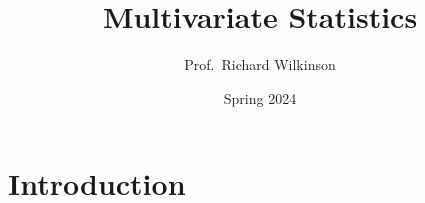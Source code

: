 \documentclass[
]{book}
\title{Multivariate Statistics}
\author{Prof.~Richard Wilkinson}
\date{Spring 2024}
\theoremstyle{definition}
\theoremstyle{definition}
\theoremstyle{definition}
\theoremstyle{definition}
\theoremstyle{remark}
\begin{document}
\maketitle

{
\setcounter{tocdepth}{1}
\tableofcontents
}
\hypertarget{introduction}{%
\chapter*{Introduction}\label{introduction}}

\newcommand{\bmu}{{\boldsymbol{\mu}}}
\newcommand{\bSigma}{\boldsymbol{\Sigma}}
\newcommand{\bLambda}{\boldsymbol \Lambda}
\newcommand{\bgamma}{\boldsymbol \gamma}
\newcommand{\bGamma}{\boldsymbol \Gamma}
\newcommand{\btheta}{\boldsymbol \theta}
\newcommand{\bdelta}{\boldsymbol \delta}
\newcommand{\bbeta}{\boldsymbol \beta}
\newcommand{\blambda}{\boldsymbol \lambda}
\newcommand{\bepsilon}{\boldsymbol \epsilon}
\newcommand{\balpha}{\boldsymbol \alpha}

\newcommand{\bA}{\mathbf A}
\newcommand{\bB}{\mathbf B}
\newcommand{\bC}{\mathbf C}
\newcommand{\bD}{\mathbf D}
\newcommand{\bE}{\mathbf E}
\newcommand{\bF}{\mathbf F}
\newcommand{\bG}{\mathbf G}
\newcommand{\bH}{\mathbf H}
\newcommand{\bI}{\mathbf I}
\newcommand{\bL}{\mathbf L}
\newcommand{\bM}{\mathbf M}
\newcommand{\bP}{\mathbf P}
\newcommand{\bQ}{\mathbf Q}
\newcommand{\bR}{\mathbf R}
\newcommand{\mR}{\mathbb R}
\newcommand{\bS}{\mathbf S}
\newcommand{\bT}{\mathbf T}
\newcommand{\bV}{\mathbf V}
\newcommand{\bU}{\mathbf U}
\newcommand{\bW}{\mathbf W}
\newcommand{\bX}{\mathbf X}
\newcommand{\bY}{\mathbf Y}
\newcommand{\bZ}{\mathbf Z}
\newcommand{\rd}{\mathrm d}

\newcommand{\ba}{\mathbf a}
\newcommand{\bb}{\mathbf b}
\newcommand{\bc}{\mathbf c}
\newcommand{\bd}{\mathbf d}
\newcommand{\be}{\mathbf e}
\newcommand{\bg}{\mathbf g}
\newcommand{\bh}{\mathbf h}
\newcommand{\bk}{\mathbf k}
\newcommand{\bn}{\mathbf n}
\newcommand{\bp}{\mathbf p}
\newcommand{\bq}{\mathbf q}
\newcommand{\br}{\mathbf r}
\newcommand{\bt}{{\mathbf t}}
\newcommand{\bu}{\mathbf u}
\newcommand{\bv}{\mathbf v}
\newcommand{\bw}{\mathbf w}
\newcommand{\bx}{\mathbf x}
\newcommand{\by}{\mathbf y}
\newcommand{\bz}{\mathbf z}

\newcommand{\bzero}{{\boldsymbol 0}}

\newcommand{\cR}{\mathcal R}

\newcommand{\bs}{\boldsymbol}
\newcommand{\ds}{\displaystyle}
\newcommand{\tdiag}{\text{diag}}
\newcommand{\ttr}{\text{tr}}
\newcommand{\tmin}{\text{min}}
\newcommand{\tmax}{\text{max}}
\newcommand{\tdet}{\text{det}}
\newcommand{\tr}{\operatorname{tr}}
\newcommand{\indep}{\perp \!\!\! \perp}
\end{document}
